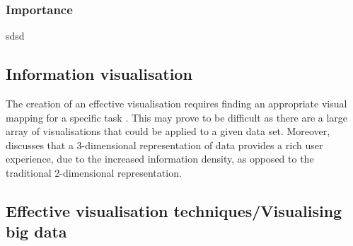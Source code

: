 \documentclass[a4paper]{article}
\begin{document}
{{{{				}
					
		
			}
				
			\subsubsection{Importance} {
	
				sdsd				
	
			}
		
		}
		
		\subsection{Information visualisation} {
		
			The creation of an effective visualisation requires finding an appropriate visual mapping for a specific task \citep{rohrer1997web}. This may prove to be difficult as there are a large array of visualisations that could be applied to a given data set. Moreover, \citet{hendley1995case} discusses that a 3-dimensional representation of data provides a rich user experience, due to the increased information density, as opposed to the traditional 2-dimensional representation. 
		
		}
		
		\subsection{Effective visualisation techniques/Visualising big data} {
		
		}
	
	}
	
	\newpage
	
\end{document}
